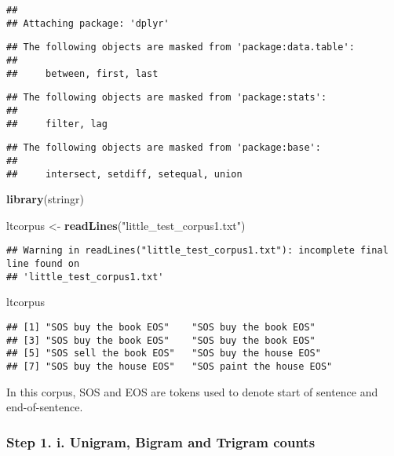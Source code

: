 \documentclass[
]{article}
\newenvironment{Shaded}{\begin{snugshade}}{\end{snugshade}}
\newcommand{\KeywordTok}[1]{\textcolor[rgb]{0.13,0.29,0.53}{\textbf{#1}}}
\newcommand{\NormalTok}[1]{#1}
\newcommand{\StringTok}[1]{\textcolor[rgb]{0.31,0.60,0.02}{#1}}
\begin{document}
\begin{verbatim}
## 
## Attaching package: 'dplyr'
\end{verbatim}

\begin{verbatim}
## The following objects are masked from 'package:data.table':
## 
##     between, first, last
\end{verbatim}

\begin{verbatim}
## The following objects are masked from 'package:stats':
## 
##     filter, lag
\end{verbatim}

\begin{verbatim}
## The following objects are masked from 'package:base':
## 
##     intersect, setdiff, setequal, union
\end{verbatim}

\begin{Shaded}
\begin{Highlighting}[]
\KeywordTok{library}\NormalTok{(stringr)}

\NormalTok{ltcorpus \textless{}{-}}\StringTok{ }\KeywordTok{readLines}\NormalTok{(}\StringTok{"little\_test\_corpus1.txt"}\NormalTok{)}
\end{Highlighting}
\end{Shaded}

\begin{verbatim}
## Warning in readLines("little_test_corpus1.txt"): incomplete final line found on
## 'little_test_corpus1.txt'
\end{verbatim}

\begin{Shaded}
\begin{Highlighting}[]
\NormalTok{ltcorpus}
\end{Highlighting}
\end{Shaded}

\begin{verbatim}
## [1] "SOS buy the book EOS"    "SOS buy the book EOS"   
## [3] "SOS buy the book EOS"    "SOS buy the book EOS"   
## [5] "SOS sell the book EOS"   "SOS buy the house EOS"  
## [7] "SOS buy the house EOS"   "SOS paint the house EOS"
\end{verbatim}

In this corpus, SOS and EOS are tokens used to denote start of sentence
and end-of-sentence.

\hypertarget{step-1.-i.-unigram-bigram-and-trigram-counts}{%
\subsubsection{Step 1. i. Unigram, Bigram and Trigram
counts}\label{step-1.-i.-unigram-bigram-and-trigram-counts}}
\end{document}
